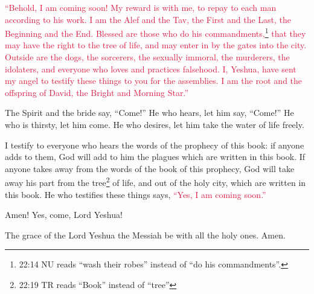 \myverse{}\textcolor{crimson}{“Behold, I am coming soon! My reward is with me, to repay
	to each man according to his work.
}
\myverse{}\textcolor{crimson}{I am the Alef and the Tav, the First and the Last, the Beginning and
	the End.
}
\myverse{}\textcolor{crimson}{Blessed are those who do his commandments,}\footnote{22:14 NU reads “wash their robes” instead of “do his commandments”.}
\textcolor{crimson}{that they may have the right to the tree of life, and may enter in by the gates into the city.
}
\myverse{}\textcolor{crimson}{Outside are the dogs, the sorcerers, the sexually immoral, the murderers,
	the idolaters, and everyone who loves and practices falsehood.
}
\myverse{}\textcolor{crimson}{I, Yeshua, have sent my angel to testify these things to you for the
	assemblies. I am the root and the offspring of David, the Bright and Morning Star.”}

\myverse{}The Spirit and the bride say, “Come!” He who hears, let him
say, “Come!” He who is thirsty, let him come. He who desires, let him take the water of life freely.

\myverse{}I testify to everyone who hears the words of the prophecy of
this book: if anyone adds to them, God will add to him the plagues which are written in this book.
\myverse{}If anyone takes away from the words of the book of this prophecy, God will
take away his part from the tree\footnote{22:19 TR reads “Book” instead of “tree”} of life, and out of the holy city, which are written
in this book.
\myverse{}He who testifies these things says,
\textcolor{crimson}{“Yes, I am coming soon.”
}

Amen! Yes, come, Lord Yeshua!

\myverse{}The grace of the Lord Yeshua the Messiah be with all the holy ones.
Amen.


